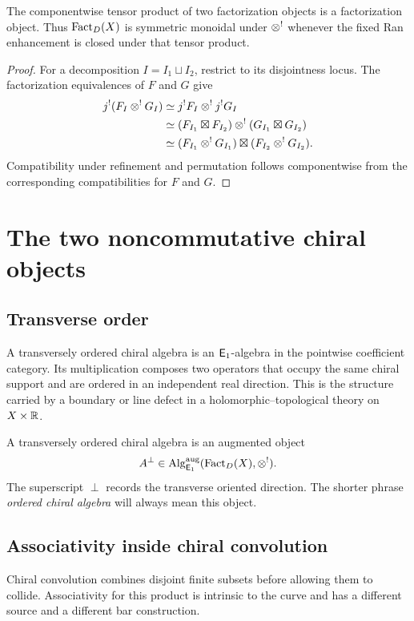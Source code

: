 \begin{proposition}
The componentwise tensor product of two factorization objects is a factorization object. Thus $\operatorname{Fact}_D(X)$ is symmetric monoidal under $\otimes^!$ whenever the fixed Ran enhancement is closed under that tensor product.
\end{proposition}
\begin{proof}
For a decomposition $I=I_1\sqcup I_2$, restrict to its disjointness locus. The factorization equivalences of $F$ and $G$ give
\[
\begin{aligned}
 j^!(F_I\otimes^!G_I)
 &\simeq j^!F_I\otimes^!j^!G_I\\
 &\simeq (F_{I_1}\boxtimes F_{I_2})\otimes^!
          (G_{I_1}\boxtimes G_{I_2})\\
 &\simeq (F_{I_1}\otimes^!G_{I_1})\boxtimes
          (F_{I_2}\otimes^!G_{I_2}).
\end{aligned}
\]
Compatibility under refinement and permutation follows componentwise from the corresponding compatibilities for $F$ and $G$.
\end{proof}


\chapter{The two noncommutative chiral objects}
\section{Transverse order}
A transversely ordered chiral algebra is an $\mathsf E_1$-algebra in the pointwise coefficient category.  Its multiplication composes two operators that occupy the same chiral support and are ordered in an independent real direction.  This is the structure carried by a boundary or line defect in a holomorphic--topological theory on $X\times\mathbb R$.

\begin{definition}
A transversely ordered chiral algebra is an augmented object
\[
 A^\perp\in\operatorname{Alg}_{\mathsf E_1}^{\mathrm{aug}}(\operatorname{Fact}_D(X),\otimes^!).
\]
The superscript $\perp$ records the transverse oriented direction.  The shorter phrase \emph{ordered chiral algebra} will always mean this object.
\end{definition}

\section{Associativity inside chiral convolution}
Chiral convolution combines disjoint finite subsets before allowing them to collide.  Associativity for this product is intrinsic to the curve and has a different source and a different bar construction.

